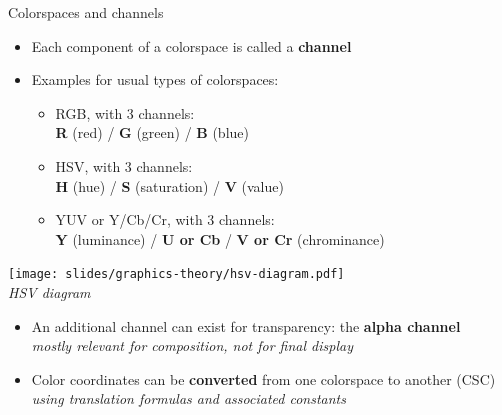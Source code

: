 \begin{frame}{Colorspaces and channels}
  \begin{minipage}[b]{0.7\textwidth}
    \begin{itemize}
    \item Each component of a colorspace is called a \textbf{channel}
    \item Examples for usual types of colorspaces:
      \begin{itemize}
      \item RGB, with 3 channels:\\ \textbf{R} (red) / \textbf{G} (green) / \textbf{B} (blue)
      \item HSV, with 3 channels:\\ \textbf{H} (hue) / \textbf{S} (saturation) / \textbf{V} (value)
      \item YUV or Y/Cb/Cr, with 3 channels:\\ \textbf{Y} (luminance) / \textbf{U or Cb} / \textbf{V or Cr} (chrominance)
      \end{itemize}
    \end{itemize}
  \end{minipage}
  \hfill
  \begin{minipage}[b]{0.25\textwidth}
    \centering
    \texttt{[image: slides/graphics-theory/hsv-diagram.pdf]}\\
    \vspace{-1em}
    \textit{\small HSV diagram}
    \vspace{0.25em}
  \end{minipage}
  \begin{itemize}
  \item An additional channel can exist for transparency: the \textbf{alpha channel}\\
  \textit{mostly relevant for composition, not for final display}
  \item Color coordinates can be \textbf{converted} from one colorspace to another (CSC)\\
  \textit{using translation formulas and associated constants}
  \end{itemize}
\end{frame}

